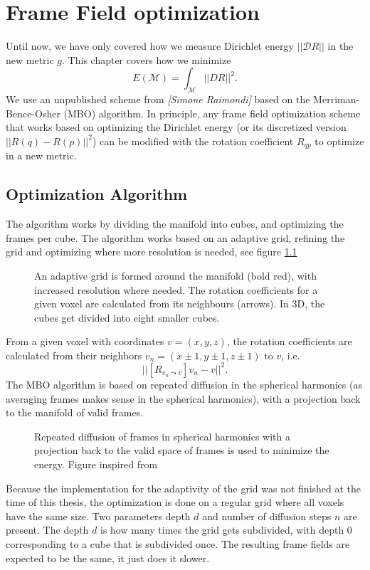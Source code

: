 \documentclass[../thesis.tex]{subfiles}
\begin{document}
\chapter{Frame Field optimization}
\label{ch:optimization}
Until now, we have only covered how we measure Dirichlet energy $||\mathcal{D}R||$ in
the new metric $g$.
This chapter covers how we minimize
$$E(\mathcal{M})=\int_{\mathcal{M}}||DR||^2.$$
We use an unpublished scheme from \emph{[Simone Raimondi]} based
on the Merriman-Bence-Osher (MBO) algorithm.
In principle, any frame field optimization scheme that works based on
optimizing the Dirichlet energy (or its discretized version $||R(q)-R(p)||^2$) can be
modified with the rotation coefficient $R_{qp}$ to optimize in a new metric.
\section{Optimization Algorithm}
The algorithm works by dividing the manifold into cubes,
and optimizing the frames per cube. The algorithm works based on an adaptive
grid, refining the grid and optimizing where more resolution is needed, see figure \ref{fig:grid} 
\begin{figure}[htb]
    \centering
    \def\svgwidth{20em}
    
    \caption{An adaptive grid is formed around the manifold (bold red), with increased resolution where needed.
    The rotation coefficients for a given voxel are calculated from its neighbours (arrows).
    In 3D, the cubes get divided into eight smaller cubes.}
    \label{fig:grid}
\end{figure}
From a given voxel with coordinates $v=(x,y,z)$, the rotation coefficients
are calculated from their neighbors $v_n=(x\pm 1,y\pm 1,z\pm 1)$ to $v$,
i.e. $$||[R_{v_n\leadsto v}]v_n - v||^2.$$
The MBO algorithm is based on repeated diffusion in the spherical harmonics (as averaging frames
makes sense in the spherical harmonics), with a projection back to the manifold
of valid frames.
\begin{figure}[htb]
    \centering
    \def\svgwidth{20em}
    
    \caption{Repeated diffusion of frames in spherical harmonics with a projection back to the
    valid space of frames is used to minimize the energy. Figure inspired from \cite{Palmer} }
    \label{fig:diffusionprojection}
\end{figure}


Because the implementation for the adaptivity of the grid was not finished
at the time of this thesis, the optimization is done on a regular grid where
all voxels have the same size. Two parameters depth $d$ and number of diffusion steps $n$
are present. The depth $d$ is how many times the grid gets subdivided, with depth $0$
corresponding to a cube that is subdivided once.
The resulting frame fields are expected to be the same, it just does it slower.
\end{document}
